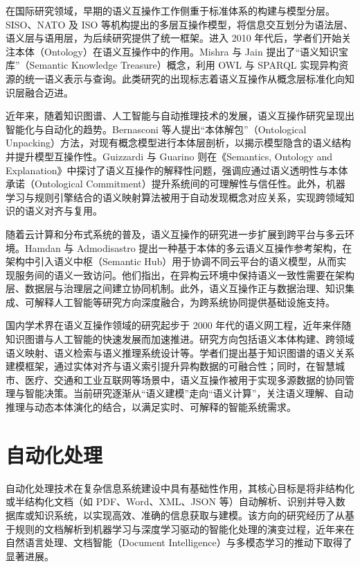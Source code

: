 在国际研究领域，早期的语义互操作工作侧重于标准体系的构建与模型分层。SISO、NATO 及 ISO 等机构提出的多层互操作模型，将信息交互划分为语法层、语义层与语用层\cite{SISO_STD_002_2006,CJCSI_6610_01F_2021}，为后续研究提供了统一框架。进入 2010 年代后，学者们开始关注本体（Ontology）在语义互操作中的作用。Mishra 与 Jain 提出了“语义知识宝库”（Semantic Knowledge Treasure）概念，利用 OWL 与 SPARQL 实现异构资源的统一语义表示与查询\cite{Mishra2018Semantic}。此类研究的出现标志着语义互操作从概念层标准化向知识层融合迈进。

近年来，随着知识图谱、人工智能与自动推理技术的发展，语义互操作研究呈现出智能化与自动化的趋势。Bernasconi 等人提出“本体解包”（Ontological Unpacking）方法，对现有概念模型进行本体层剖析，以揭示模型隐含的语义结构并提升模型互操作性\cite{Bernasconi2022Ontological}。Guizzardi 与 Guarino 则在《Semantics, Ontology and Explanation》中探讨了语义互操作的解释性问题，强调应通过语义透明性与本体承诺（Ontological Commitment）提升系统间的可理解性与信任性\cite{Guizzardi2023Explanation}。此外，机器学习与规则引擎结合的语义映射算法被用于自动发现概念对应关系，实现跨领域知识的语义对齐与复用。

随着云计算和分布式系统的普及，语义互操作的研究进一步扩展到跨平台与多云环境。Hamdan 与 Admodisastro 提出一种基于本体的多云语义互操作参考架构，在架构中引入语义中枢（Semantic Hub）用于协调不同云平台的语义模型，从而实现服务间的语义一致访问\cite{Hamdan2023Reference,SemanticMultiCloud2024}。他们指出，在异构云环境中保持语义一致性需要在架构层、数据层与治理层之间建立协同机制。此外，语义互操作正与数据治理、知识集成、可解释人工智能等研究方向深度融合，为跨系统协同提供基础设施支持。

国内学术界在语义互操作领域的研究起步于 2000 年代的语义网工程，近年来伴随知识图谱与人工智能的快速发展而加速推进。研究方向包括语义本体构建、跨领域语义映射、语义检索与语义推理系统设计等。学者们提出基于知识图谱的语义关系建模框架，通过实体对齐与语义索引提升异构数据的可融合性；同时，在智慧城市、医疗、交通和工业互联网等场景中，语义互操作被用于实现多源数据的协同管理与智能决策。当前研究逐渐从“语义建模”走向“语义计算”，关注语义理解、自动推理与动态本体演化的结合，以满足实时、可解释的智能系统需求。


\section{自动化处理}

自动化处理技术在复杂信息系统建设中具有基础性作用，其核心目标是将非结构化或半结构化文档（如 PDF、Word、XML、JSON 等）自动解析、识别并导入数据库或知识系统，以实现高效、准确的信息获取与建模。该方向的研究经历了从基于规则的文档解析到机器学习与深度学习驱动的智能化处理的演变过程，近年来在自然语言处理、文档智能（Document Intelligence）与多模态学习的推动下取得了显著进展。

